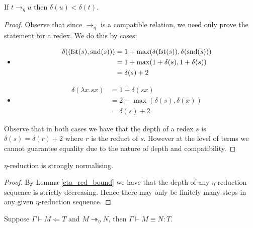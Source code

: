 \begin{lemma}\label{eta_red_bound}
    If $t \to_{\eta} u$ then $\delta(u) < \delta(t)$.
\end{lemma}

\begin{proof}
    Observe that since $\to_{\eta}$ is a compatible relation, we need only prove the statement for a redex. We do this by cases:
    \begin{itemize}
        \item
        $$
            \begin{aligned}
                \delta ((\mathrm{fst}(s), \mathrm{snd}(s))) &= 1+ \max(\delta(\mathrm{fst}(s)), \delta(\mathrm{snd}(s))) \\
                &= 1 + \max(1+ \delta(s), 1+ \delta(s)) \\
                &= \delta(s)+ 2
            \end{aligned}
        $$
        \item
        $$
            \begin{aligned}
                \delta (\lambda x . s x) &= 1 + \delta(s x) \\
                &= 2 + \max(\delta(s), \delta(x)) \\
                &= \delta(s) + 2
            \end{aligned}
        $$
    \end{itemize}
    Observe that in both cases we have that the depth of a redex $s$ is $\delta(s) = \delta(r) + 2$ where $r$ is the reduct of $s$. However at the level of terms we cannot guarantee equality due to the nature of depth and compatibility. 
\end{proof}

\begin{lemma}\label{eta_SN}
    $\eta$-reduction is strongly normalising.
\end{lemma}

\begin{proof}
    By Lemma \ref{eta_red_bound} we have that the depth of any $\eta$-reduction sequence is strictly decreasing. Hence there may only be finitely many steps in any given $\eta$-reduction sequence.
\end{proof}

\begin{lemma}\label{eta_coh}
    Suppose $\Gamma \vdash M \Leftarrow T$ and $M \twoheadrightarrow_{\eta} N$, then $\Gamma \vdash M \equiv N : T$.
\end{lemma}

